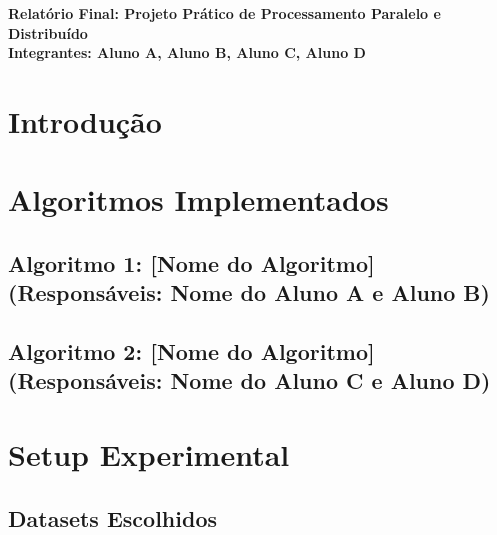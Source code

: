 \documentclass[11pt]{article}
\begin{document}
\begin{center}
    \Large\textbf{Relatório Final: Projeto Prático de Processamento Paralelo e Distribuído}\\
    \textbf{Integrantes: Aluno A, Aluno B, Aluno C, Aluno D}
\end{center}


\section{Introdução}

\section{Algoritmos Implementados}

\subsection{Algoritmo 1: [Nome do Algoritmo] (Responsáveis: Nome do Aluno A e Aluno B)}

\subsection{Algoritmo 2: [Nome do Algoritmo] (Responsáveis: Nome do Aluno C e Aluno D)}

\section{Setup Experimental}

\subsection{Datasets Escolhidos}
\end{document}
